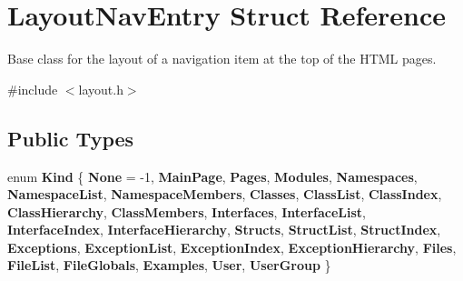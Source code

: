 \hypertarget{struct_layout_nav_entry}{}\section{Layout\+Nav\+Entry Struct Reference}
\label{struct_layout_nav_entry}


Base class for the layout of a navigation item at the top of the H\+T\+ML pages.  




{\ttfamily \#include $<$layout.\+h$>$}

\subsection*{Public Types}
\begin{DoxyCompactItemize}
\item 
\mbox{\label{struct_layout_nav_entry_aef36305dd829f7cde87ca203ae647c7c}} 
enum {\bfseries Kind} \{ \newline
{\bfseries None} = -\/1, 
{\bfseries Main\+Page}, 
{\bfseries Pages}, 
{\bfseries Modules}, 
\newline
{\bfseries Namespaces}, 
{\bfseries Namespace\+List}, 
{\bfseries Namespace\+Members}, 
{\bfseries Classes}, 
\newline
{\bfseries Class\+List}, 
{\bfseries Class\+Index}, 
{\bfseries Class\+Hierarchy}, 
{\bfseries Class\+Members}, 
\newline
{\bfseries Interfaces}, 
{\bfseries Interface\+List}, 
{\bfseries Interface\+Index}, 
{\bfseries Interface\+Hierarchy}, 
\newline
{\bfseries Structs}, 
{\bfseries Struct\+List}, 
{\bfseries Struct\+Index}, 
{\bfseries Exceptions}, 
\newline
{\bfseries Exception\+List}, 
{\bfseries Exception\+Index}, 
{\bfseries Exception\+Hierarchy}, 
{\bfseries Files}, 
\newline
{\bfseries File\+List}, 
{\bfseries File\+Globals}, 
{\bfseries Examples}, 
{\bfseries User}, 
\newline
{\bfseries User\+Group}
 \}
\end{DoxyCompactItemize}
